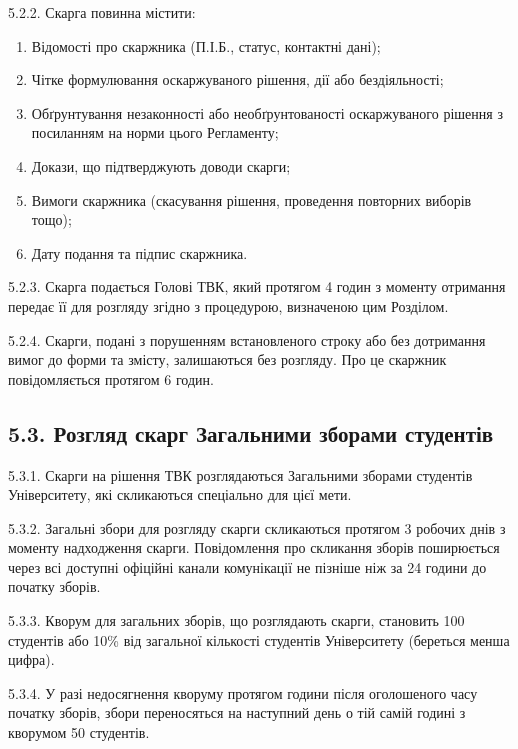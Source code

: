    5.2.2. Скарга повинна містити:

        \begin{enumerate}[label=\alph*)]
            \item Відомості про скаржника (П.І.Б., статус, контактні дані);
            \item Чітке формулювання оскаржуваного рішення, дії або бездіяльності;
            \item Обґрунтування незаконності або необґрунтованості оскаржуваного рішення з посиланням на норми цього Регламенту;
            \item Докази, що підтверджують доводи скарги;
            \item Вимоги скаржника (скасування рішення, проведення повторних виборів тощо);
            \item Дату подання та підпис скаржника.
        \end{enumerate}

    5.2.3. Скарга подається Голові ТВК, який протягом 4 годин з моменту отримання передає її для розгляду згідно з процедурою, визначеною цим Розділом.

    5.2.4. Скарги, подані з порушенням встановленого строку або без дотримання вимог до форми та змісту, залишаються без розгляду. Про це скаржник повідомляється протягом 6 годин.

\subsection*{5.3. Розгляд скарг Загальними зборами студентів}
    5.3.1. Скарги на рішення ТВК розглядаються Загальними зборами студентів Університету, які скликаються спеціально для цієї мети.

    5.3.2. Загальні збори для розгляду скарги скликаються протягом 3 робочих днів з моменту надходження скарги. Повідомлення про скликання зборів поширюється через всі доступні офіційні канали комунікації не пізніше ніж за 24 години до початку зборів.

    5.3.3. Кворум для загальних зборів, що розглядають скарги, становить 100 студентів або 10\% від загальної кількості студентів Університету (береться менша цифра).

    5.3.4. У разі недосягнення кворуму протягом години після оголошеного часу початку зборів, збори переносяться на наступний день о тій самій годині з кворумом 50 студентів.

